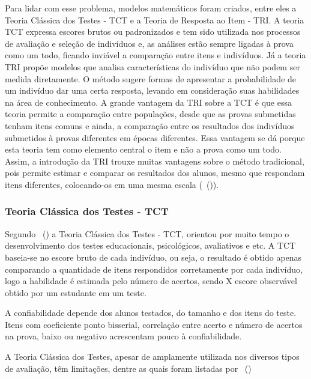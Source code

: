 \documentclass[
	article,			%
	11pt,				%
	oneside,			%
	a4paper,			%
	english,			%
	brazil,				%
	sumario=tradicional
]{abntex2}
\newcommand{\citeaa}[1]{\citeauthoronline{#1}~(\citeyear{#1})}
\begin{document}
			Para lidar com esse problema, modelos matemáticos foram criados, entre eles a Teoria Clássica dos Testes - TCT e a Teoria de Resposta ao Item - TRI. A teoria TCT expressa escores brutos ou padronizados e tem sido utilizada nos processos de avaliação e seleção de indivíduos e, as análises estão sempre ligadas à prova como um todo, ficando inviável a comparação entre itens e indivíduos. Já a teoria TRI propõe modelos que analisa características do indivíduo que não podem ser medida diretamente. O método sugere formas de apresentar a probabilidade de um indivíduo dar uma certa resposta, levando em consideração suas habilidades na área de conhecimento. A grande vantagem da TRI sobre a TCT é que essa teoria permite a comparação entre populações, desde que as provas submetidas tenham itens comuns e ainda, a comparação entre os resultados dos indivíduos submetidos à provas diferentes em épocas diferentes. Essa vantagem se dá porque esta teoria tem como elemento central o item e não a prova como um todo. Assim, a introdução da TRI trouxe muitas vantagens sobre o método tradicional, pois permite estimar e comparar os resultados dos alunos, mesmo que respondam itens diferentes, colocando-os em uma mesma escala (\citeaa{AlvesFerreira2018}).
			
			\subsubsection{Teoria Clássica dos Testes - TCT}
			
				Segundo \citeaa{Klein2013} a Teoria Clássica dos Testes - TCT, orientou por
				muito tempo o desenvolvimento dos testes educacionais, psicológicos, avaliativos e etc. A
				TCT baseia-se no escore bruto de cada indivíduo, ou seja, o resultado é obtido apenas
				comparando a quantidade de itens respondidos corretamente por cada indivíduo, logo a
				habilidade é estimada pelo número de acertos, sendo X escore observável obtido por um
				estudante em um teste.
				
				A confiabilidade depende dos alunos testados, do tamanho e dos itens do teste.
				Itens com coeficiente ponto bisserial, correlação entre acerto e número de acertos na prova,
				baixo ou negativo acrescentam pouco à confiabilidade.
				
				
				
				A Teoria Clássica dos Testes, apesar de amplamente utilizada nos diversos tipos de avaliação, têm limitações, dentre as quais foram listadas por \citeaa{Klein2013}
				
\end{document}
